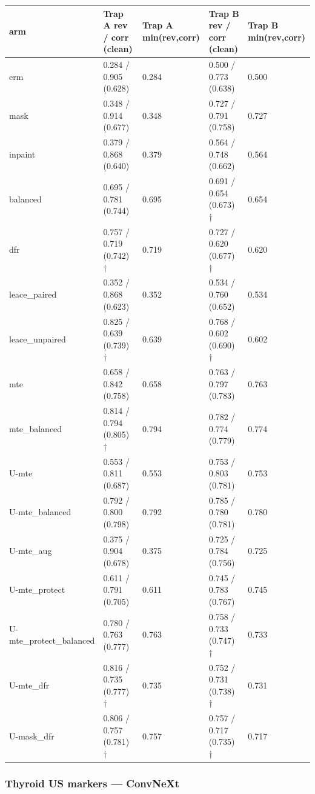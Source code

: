 {{ %
\begin{longtable}[]{@{}lllll@{}}
\toprule\noalign{}
arm & Trap A rev / corr (clean) & Trap A min(rev,corr) & Trap B rev / corr (clean) & Trap B min(rev,corr) \\
\midrule\noalign{}
\endhead
\bottomrule\noalign{}
\endlastfoot
erm & 0.284 / 0.905 (0.628) & 0.284 & 0.500 / 0.773 (0.638) & 0.500 \\
mask & 0.348 / 0.914 (0.677) & 0.348 & 0.727 / 0.791 (0.758) & 0.727 \\
inpaint & 0.379 / 0.868 (0.640) & 0.379 & 0.564 / 0.748 (0.662) & 0.564 \\
balanced & 0.695 / 0.781 (0.744) & 0.695 & 0.691 / 0.654 (0.673) † & 0.654 \\
dfr & 0.757 / 0.719 (0.742) † & 0.719 & 0.727 / 0.620 (0.677) † & 0.620 \\
leace\_paired & 0.352 / 0.868 (0.623) & 0.352 & 0.534 / 0.760 (0.652) & 0.534 \\
leace\_unpaired & 0.825 / 0.639 (0.739) † & 0.639 & 0.768 / 0.602 (0.690) † & 0.602 \\
mte & 0.658 / 0.842 (0.758) & 0.658 & 0.763 / 0.797 (0.783) & 0.763 \\
mte\_balanced & 0.814 / 0.794 (0.805) † & 0.794 & 0.782 / 0.774 (0.779) & 0.774 \\
U-mte & 0.553 / 0.811 (0.687) & 0.553 & 0.753 / 0.803 (0.781) & 0.753 \\
U-mte\_balanced & 0.792 / 0.800 (0.798) & 0.792 & 0.785 / 0.780 (0.781) & 0.780 \\
U-mte\_aug & 0.375 / 0.904 (0.678) & 0.375 & 0.725 / 0.784 (0.756) & 0.725 \\
U-mte\_protect & 0.611 / 0.791 (0.705) & 0.611 & 0.745 / 0.783 (0.767) & 0.745 \\
U-mte\_protect\_balanced & 0.780 / 0.763 (0.777) & 0.763 & 0.758 / 0.733 (0.747) † & 0.733 \\
U-mte\_dfr & 0.816 / 0.735 (0.777) † & 0.735 & 0.752 / 0.731 (0.738) † & 0.731 \\
U-mask\_dfr & 0.806 / 0.757 (0.781) † & 0.757 & 0.757 / 0.717 (0.735) † & 0.717 \\
\end{longtable}
}

\subsubsection{Thyroid US markers --- ConvNeXt}\label{thyroid-us-markers--convnext}

}
